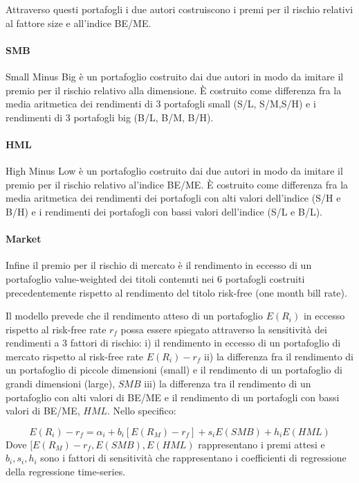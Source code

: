 Attraverso questi portafogli i due autori costruiscono i premi per il rischio relativi al fattore size e all'indice BE/ME. 

\paragraph{SMB} Small Minus Big è un portafoglio costruito dai due autori in modo da imitare il premio per il rischio relativo alla dimensione. \`E costruito come differenza fra la media aritmetica dei rendimenti di 3 portafogli small (S/L, S/M,S/H) e i rendimenti di 3 portafogli big (B/L, B/M, B/H).

\paragraph{HML} High Minus Low è un portafoglio costruito dai due autori in modo da imitare il premio per il rischio relativo al'indice BE/ME. \`E costruito come differenza fra la media aritmetica dei rendimenti dei portafogli con alti valori dell'indice (S/H e B/H) e i rendimenti dei portafogli con bassi valori dell'indice (S/L e B/L).

\paragraph{Market} Infine il premio per il rischio di mercato è il rendimento in eccesso di un portafoglio value-weighted dei titoli contenuti nei 6 portafogli costruiti precedentemente rispetto al rendimento del titolo risk-free (one month bill rate).

\hfill

 Il modello prevede che il rendimento atteso di un portafoglio $E(R_i)$ in eccesso rispetto al risk-free rate $r_f$ possa essere spiegato attraverso la sensitività dei rendimenti a 3 fattori di rischio: i) il rendimento in eccesso di un portafoglio di mercato rispetto al risk-free rate $E(R_i)-r_f$ ii) la differenza fra il rendimento di un portafoglio di piccole dimensioni (small) e il rendimento di un portafoglio di grandi dimensioni (large), $SMB$ iii) la differenza tra il rendimento di un portafoglio con alti valori di BE/ME e il rendimento di un portafogli con bassi valori di BE/ME, $HML$. Nello specifico:

\begin{equation}
E(R_i)-r_f= \alpha_i + b_i[E(R_M)-r_f]+s_iE(SMB)+ h_iE(HML)
\end{equation}
Dove $[E(R_M)-r_f, E(SMB), E(HML)$ rappresentano i premi attesi e $b_i,s_i,h_i$ sono i fattori di sensitività che rappresentano i coefficienti di regressione della regressione time-series. 

